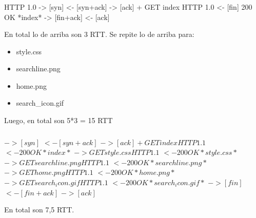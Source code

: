 \subsubsection{}
HTTP 1.0
-> [syn]
<- [syn+ack]
-> [ack] + GET index HTTP 1.0
<- [fin] 200 OK  *index*
-> [fin+ack]
<- [ack]

En total lo de arriba son 3 RTT. Se repite lo de arriba para:
\begin{itemize}
\item style.css
\item searchline.png
\item home.png
\item search\_icon.gif
\end{itemize}
Luego, en total son 5*3 = 15 RTT

\subsubsection{}
$-> [syn]$
$<- [syn+ack]$
$-> [ack] + GET index HTTP 1.1$
$<- 200 OK  *index*$
$-> GET style.css HTTP 1.1$
$<- 200 OK  *style.css*$
$-> GET searchline.png HTTP 1.1$
$<- 200 OK  *searchline.png*$
$-> GET home.png HTTP 1.1$
$<- 200 OK  *home.png*$
$-> GET search_icon.gif HTTP 1.1$
$<- 200 OK  *search_icon.gif*$
$-> [fin]$
$<- [fin+ack]$
$-> [ack]$

En total son 7,5 RTT.
